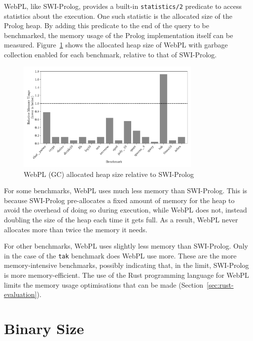\label{sec:prolog-heap-usage}

WebPL, like SWI-Prolog, provides a built-in \texttt{statistics/2} predicate to access statistics about the execution. One such statistic is the allocated size of the Prolog heap. By adding this predicate to the end of the query to be benchmarked, the memory usage of the Prolog implementation itself can be measured. Figure~\ref{fig:heap-usage} shows the allocated heap size of WebPL with garbage collection enabled for each benchmark, relative to that of SWI-Prolog.

\begin{figure}[t]
\centering
\includegraphics[width=0.8\textwidth]{relative_memory_builtin.pdf}
\caption{WebPL (GC) allocated heap size relative to SWI-Prolog}
\label{fig:heap-usage}
\end{figure}

For some benchmarks, WebPL uses much less memory than SWI-Prolog. This is because SWI-Prolog pre-allocates a fixed amount of memory for the heap to avoid the overhead of doing so during execution, while WebPL does not, instead doubling the size of the heap each time it gets full. As a result, WebPL never allocates more than twice the memory it needs.

For other benchmarks, WebPL uses slightly less memory than SWI-Prolog. Only in the case of the \texttt{tak} benchmark does WebPL use more. These are the more memory-intensive benchmarks, possibly indicating that, in the limit, SWI-Prolog is more memory-efficient. The use of the Rust programming language for WebPL limits the memory usage optimisations that can be made (Section~\ref{sec:rust-evaluation}).

\section{Binary Size}

\label{sec:binary-size}

